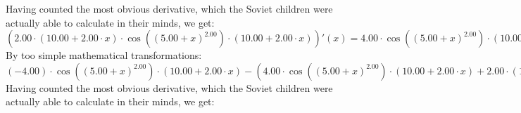 \documentclass{article}
\begin{document}
 \newline
 \newline 
Having counted the most obvious derivative, which the Soviet children were actually able to calculate in their minds, we get:
$({{2.00} \cdot {\left({{10.00} + {{2.00} \cdot {x}}}\right) \cdot { \cos {\left({\left({{5.00} + {x}}\right) ^ {2.00}}\right)}  \cdot \left({{10.00} + {{2.00} \cdot {x}}}\right)}}})'(x) = {{{4.00} \cdot { \cos {\left({\left({{5.00} + {x}}\right) ^ {2.00}}\right)}  \cdot \left({{10.00} + {{2.00} \cdot {x}}}\right)}} + {{2.00} \cdot {\left({{10.00} + {{2.00} \cdot {x}}}\right) \cdot \left({{\left({-1.00}\right) \cdot {\left({{10.00} + {{2.00} \cdot {x}}}\right) \cdot {\left({{10.00} + {{2.00} \cdot {x}}}\right) \cdot  \sin {\left({\left({{5.00} + {x}}\right) ^ {2.00}}\right)} }}} + {{2.00} \cdot  \cos {\left({\left({{5.00} + {x}}\right) ^ {2.00}}\right)} }}\right)}}}$\newline
\newline
By too simple mathematical transformations:
 ${{\left({-4.00}\right) \cdot { \cos {\left({\left({{5.00} + {x}}\right) ^ {2.00}}\right)}  \cdot \left({{10.00} + {{2.00} \cdot {x}}}\right)}} - \left({{{4.00} \cdot { \cos {\left({\left({{5.00} + {x}}\right) ^ {2.00}}\right)}  \cdot \left({{10.00} + {{2.00} \cdot {x}}}\right)}} + {{2.00} \cdot {\left({{10.00} + {{2.00} \cdot {x}}}\right) \cdot \left({{\left({-1.00}\right) \cdot {\left({{10.00} + {{2.00} \cdot {x}}}\right) \cdot {\left({{10.00} + {{2.00} \cdot {x}}}\right) \cdot  \sin {\left({\left({{5.00} + {x}}\right) ^ {2.00}}\right)} }}} + {{2.00} \cdot  \cos {\left({\left({{5.00} + {x}}\right) ^ {2.00}}\right)} }}\right)}}}\right)} = {{\left({-4.00}\right) \cdot { \cos {\left({\left({{5.00} + {x}}\right) ^ {2.00}}\right)}  \cdot \left({{10.00} + {{2.00} \cdot {x}}}\right)}} + {{\left({-4.00}\right) \cdot { \cos {\left({\left({{5.00} + {x}}\right) ^ {2.00}}\right)}  \cdot \left({{10.00} + {{2.00} \cdot {x}}}\right)}} - {{2.00} \cdot {\left({{10.00} + {{2.00} \cdot {x}}}\right) \cdot \left({{\left({-1.00}\right) \cdot {\left({{10.00} + {{2.00} \cdot {x}}}\right) \cdot {\left({{10.00} + {{2.00} \cdot {x}}}\right) \cdot  \sin {\left({\left({{5.00} + {x}}\right) ^ {2.00}}\right)} }}} + {{2.00} \cdot  \cos {\left({\left({{5.00} + {x}}\right) ^ {2.00}}\right)} }}\right)}}}}$ 
 \newline
 \newline 
Having counted the most obvious derivative, which the Soviet children were actually able to calculate in their minds, we get:
\end{document}
